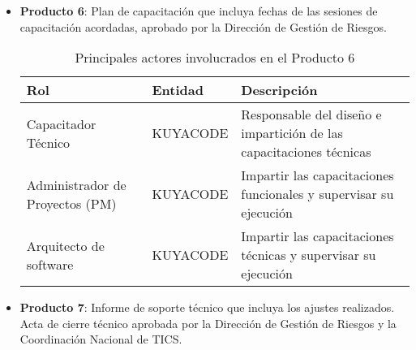\begin{itemize}
    \item \textbf{Producto 6}: Plan de capacitación que incluya fechas de las sesiones de capacitación acordadas, aprobado por la Dirección de Gestión de Riesgos.
    
    \begin{table}[h]
        \centering
        \begin{tabular}{|p{3cm}|p{5cm}|p{7cm}|}
            \hline
            \textbf{Rol} & \textbf{Entidad} & \textbf{Descripción} \\
            \hline
            Capacitador Técnico & KUYACODE & Responsable del diseño e impartición de las capacitaciones técnicas \\
            \hline
            Administrador de Proyectos (PM) & KUYACODE & Impartir las capacitaciones funcionales y supervisar su ejecución \\
            \hline
            Arquitecto de software & KUYACODE & Impartir las capacitaciones técnicas y supervisar su ejecución \\
            \hline
        \end{tabular}
        \caption{Principales actores involucrados en el Producto 6}
        \label{tab:actores_producto6}
    \end{table} 
    \item \textbf{Producto 7}: Informe de soporte técnico que incluya los ajustes realizados. Acta de cierre técnico aprobada por la Dirección de Gestión de Riesgos y la Coordinación Nacional de TICS.


\end{itemize}
